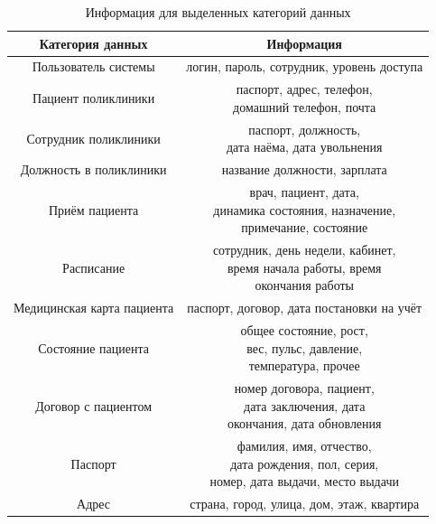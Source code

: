 \begin{table}[H]
\begin{center}
	\captionsetup{justification=raggedright,singlelinecheck=off,margin=5mm}
	\caption{Информация для выделенных категорий данных}
	\begin{tabular}{| c | c |}
		\hline
		Категория данных & Информация \\
		\hline
		Пользователь системы & логин, пароль, сотрудник, уровень доступа \\
		\hline
		Пациент поликлиники & \makecell{паспорт, адрес, телефон,\\ домашний телефон, почта}  \\
		\hline
		Сотрудник поликлиники & \makecell{паспорт, должность, \\дата наёма, дата увольнения} \\
		\hline
		Должность в поликлиники & название должности, зарплата \\
		\hline
		Приём пациента & 
\makecell{врач, пациент, дата, \\
	динамика состояния, назначение,\\
	примечание, состояние}\\
		\hline
		Расписание &\makecell{сотрудник, день недели, кабинет, \\
время начала работы, время \\окончания работы}\\
		\hline
		Медицинская карта пациента & паспорт, договор, дата постановки на учёт \\
		\hline
		Состояние пациента & \makecell{общее состояние, рост,\\ вес, пульс, давление, \\температура, прочее }\\
		\hline
		Договор с пациентом & \makecell{номер договора, пациент, \\дата заключения, дата \\окончания, дата обновления} \\
		\hline
		Паспорт & \makecell{фамилия, имя, отчество, \\
дата рождения, пол, серия, \\
номер, дата выдачи, место выдачи} \\
		\hline
		Адрес & страна, город, улица, дом, этаж, квартира \\
		\hline
	\end{tabular}
	\label{table:category-info}
\end{center}
\end{table}

